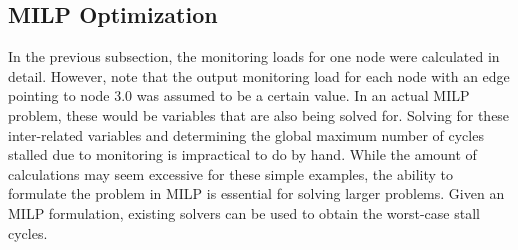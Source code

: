 \subsection{MILP Optimization}

In the previous subsection, the monitoring loads for one node were calculated
in detail. However, note that the output monitoring load for each node with an
edge pointing to node 3.0 was assumed to be a certain value. In an actual MILP
problem, these would be variables that are also being solved for. Solving for
these inter-related variables and determining the global maximum number of
cycles stalled due to monitoring is impractical to do by hand.  While the
amount of calculations may seem excessive for these simple examples, the
ability to formulate the problem in MILP is essential for solving larger
problems. Given an MILP formulation, existing solvers \cite{lpsolve, cplex} can
be used to obtain the worst-case stall cycles.

